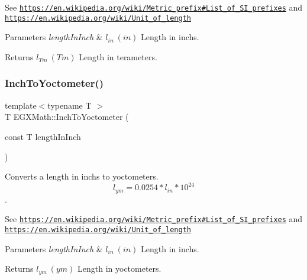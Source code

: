 See \href{https://en.wikipedia.org/wiki/Metric_prefix#List_of_SI_prefixes}{\tt https\+://en.\+wikipedia.\+org/wiki/\+Metric\+\_\+prefix\#\+List\+\_\+of\+\_\+\+S\+I\+\_\+prefixes} and \href{https://en.wikipedia.org/wiki/Unit_of_length}{\tt https\+://en.\+wikipedia.\+org/wiki/\+Unit\+\_\+of\+\_\+length} 
\begin{DoxyParams}{Parameters}
{\em length\+In\+Inch} & $ l_{in}\ (in)$ Length in inchs. \\
\hline
\end{DoxyParams}
\begin{DoxyReturn}{Returns}
$ l_{Tm}\ (Tm)$ Length in terameters. 
\end{DoxyReturn}
\mbox{\label{group___e_g_x_math-_conversions-_length_conversions-_imperial-_inch-_s_i_gaa74c358f0539e80771235b9fe0895282}} 
\subsubsection{\texorpdfstring{Inch\+To\+Yoctometer()}{InchToYoctometer()}}
{\footnotesize\ttfamily template$<$typename T $>$ \\
T E\+G\+X\+Math\+::\+Inch\+To\+Yoctometer (\begin{DoxyParamCaption}\item[{const T}]{length\+In\+Inch }\end{DoxyParamCaption})}



Converts a length in inchs to yoctometers. \[ l_{ym}=0.0254 * l_{in} * 10^{24} \]. 

See \href{https://en.wikipedia.org/wiki/Metric_prefix#List_of_SI_prefixes}{\tt https\+://en.\+wikipedia.\+org/wiki/\+Metric\+\_\+prefix\#\+List\+\_\+of\+\_\+\+S\+I\+\_\+prefixes} and \href{https://en.wikipedia.org/wiki/Unit_of_length}{\tt https\+://en.\+wikipedia.\+org/wiki/\+Unit\+\_\+of\+\_\+length} 
\begin{DoxyParams}{Parameters}
{\em length\+In\+Inch} & $ l_{in}\ (in)$ Length in inchs. \\
\hline
\end{DoxyParams}
\begin{DoxyReturn}{Returns}
$ l_{ym}\ (ym)$ Length in yoctometers. 
\end{DoxyReturn}
\mbox{\label{group___e_g_x_math-_conversions-_length_conversions-_imperial-_inch-_s_i_ga366239d2cec41e7c095c9e73fa4ee7f3}} 

